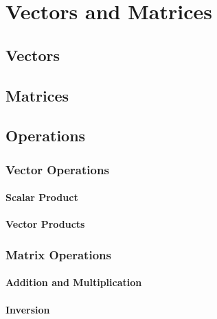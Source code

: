 \section{Vectors and Matrices}

\subsection{Vectors}

\subsection{Matrices}


\subsection{Operations}

\subsubsection{Vector Operations}
\paragraph{Scalar Product}
\paragraph{Vector Products}

\subsubsection{Matrix Operations}
\paragraph{Addition and Multiplication}
\paragraph{Inversion}


